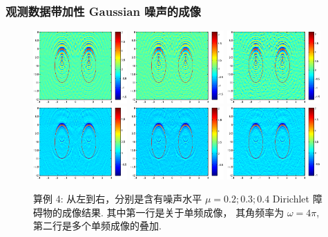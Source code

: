 \documentclass[8pt]{beamer}
\newcommand{\om}{\omega}
\begin{document}
\begin{frame}
\frametitle{观测数据带加性 Gaussian 噪声的成像}
\begin{figure}[h]
	\centering
	\includegraphics[width=0.32\textwidth]{./graphic/bi_circle_4pi_error2.eps}
	\includegraphics[width=0.32\textwidth]{./graphic/bi_circle_4pi_error4.eps}
	\includegraphics[width=0.32\textwidth]{./graphic/bi_circle_4pi_error6.eps}
	\includegraphics[width=0.32\textwidth]{./graphic/bi_circle_multi_2_8_error2.eps}
	\includegraphics[width=0.32\textwidth]{./graphic/bi_circle_multi_2_8_error4.eps}
	\includegraphics[width=0.32\textwidth]{./graphic/bi_circle_multi_2_8_error6.eps}
	
	\caption{算例 4: 从左到右，分别是含有噪声水平 $\mu =  0.2; 0.3; 0.4$ Dirichlet 障碍物的成像结果. 其中第一行是关于单频成像， 其角频率为 $\om=4\pi$, 第二行是多个单频成像的叠加.}
\end{figure}
\end{frame}
\end{document}
